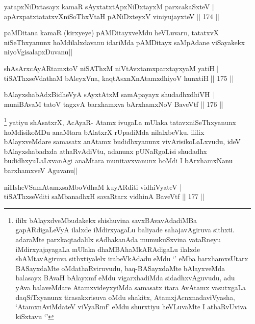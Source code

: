 \begin{shl}
yatapxNiDxtasayx kamaR sAyxtatxtApxNiDxtayxM parxcakaSxteV |\\
apArxpatxtatatxvXniSoThxV\s taH pANiDxteyxV viniyujayxteV \hfill || 174 ||
\end{shl}

\begin{artha}
paMDitana kamaR (kirxyeye) pAMDitayxveMdu heVLuvaru, tatatxvX niSeThxyanunx hoMdilalxdavanu idariMda pAMDitayx saMpAdane viSayakekx niyoVgisalapxDuvanu||
\end{artha}


\begin{shl}
shAsArxcAyARtamxtoV niSAThxM niVtAvx\s \s tamxparxtayxyaM yatiH |\\
tiSAThxseVdathaM bAleyxVna, kaqtAsxnXnAtamxdhiyoV hunxtiH \hfill || 175 ||
\end{shl}

\begin{shl}
bAlayxshabAdxBidheVyA sAyxtAtxM samApayayx shudadhxdhiVH |\\
muniBAvaM tatoV tagxvA barxhamxva bArxhamxNoV BaveVtf \hfill || 176 ||
\end{shl}

\begin{artha}
\footnote[1]{ililx bAlayxdveMbudakekx shishuvina savxBAvavAdadiMBa gapARdigaLeVyA ilalxde iMdirxyagaLu baliyade sahajavAgiruva sithxti. adaraMte parxkaqtadalilx sAdhakanAda mumukuSxvina vataRneyu iMdirxyajayagaLa mUlaka dhaMBAhaMkARAdigaLu ilalxde shAMtavAgiruva sithxtiyalelx irabeVkAdadu eMdu `\stext ' eMba barxhamxsUtarx BASayxdaMte oMdathaRviruvudu, baq-BASayxdaMte bAlayxveMda balasayx BAvaH bAlayxmf eMdu vigarxhadiMda sidadhxvAguvudu, adu yAva balaveMdare AtamxvideyxyiMda samasatx itara AvAtamx vasutxgaLa daqSiTxyanunx  tirasakxrisuva oMdu shakitx, AtamxjAcnxnadaviVyasha, `AtamxnAviMdateV viVyaRmf' eMdu shurxtiyu heVLuvaMte I athaRvUviva kiSxtavu `\stext '} yatiyu shAsatxrX, AcAyaR- Atamx ivugaLa mUlaka tatavxniSeThxyanunx hoMdisikoMDu anaMtara bAlatxrX rUpadiMda nilalxbeVku. ililix bAlayxveMdare samasatx anAtamx budidhxyanunx vivArisikoLaLxvudu, ideV bAlayxshabadxda athaRvAdiVtu, adanunx pUNaRgoLisi shudadhx budidhxyuLaLxvanAgi anaMtara munitavxvanunx hoMdi I bArxhamxNanu barxhamxveV Aguvanu||
\end{artha}

\begin{shl}
niHsheVSamAtamxsaMboVdhaM kuyARditi vidhiVyateV |\\
tiSAThxseVditi saMbanadhxH savaRtarx vidhinA BaveVtf \hfill || 177 ||
\end{shl}

